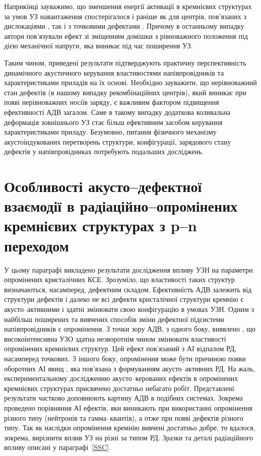 Наприкінці зауважимо, що зменшення енергії активації в кремнієвих структурах за умов
УЗ навантаження спостерігалося і раніше як для центрів, пов'язаних з дислокаціями \cite{KorotchFTP1996}, так і з точковими дефектами \cite{Korotchenkov1995}.
Причому в останньому випадку автори пов'язували ефект зі зміщенням домішки з рівноважного положення під дією механічної напруги, яка виникає під час поширення УЗ.


Таким чином, приведені результати підтверджують практичну перспективність динамічного акустичного керування властивостями напівпровідників та характеристиками приладів на їх основі.
Необхідно зауважити, що нерівноважний стан дефектів (в нашому випадку рекомбінаційних центрів), який виникає при появі нерівноважних носіїв заряду,
є важливим фактором підвищення ефективності АДВ загалом.
Саме в такому випадку додаткова коливальна деформація зовнішнього УЗ стає більш ефективним засобом керування характеристиками приладу.
Безумовно, питання фізичного механізму акустоіндукованих перетворень структури, конфігурації, зарядового стану дефектів у напівпровідниках потребують подальших досліджень.



\section{Особливості акусто--дефектної взаємодії в радіаційно--опромінених кремнієвих структурах з p--n переходом\label{Rad_SSC}}
У цьому параграфі викладено результати дослідження впливу УЗН на параметри опромінених кристалічних КСЕ.
Зрозуміло, що властивості таких структур визначаються, насамперед, дефектним складом.
Ефективність АДВ залежить від структури дефектів \cite{UST:Medvid} і
далеко не всі дефекти кристалічної структури кремнію є акусто--активними і здатні змінювати свою конфігурацію в умовах УЗН.
Одним з найбільш поширених та вивчених способів зміни дефектної підсистеми напівпровідників є опромінення.
З точки зору АДВ, з одного боку, виявлено \cite{YOlikh2007TPLr,Parchinskii2006r,Gorb2010,Podolian2012r}, що високоінтенсивна УЗО
здатна незворотнім чином змінювати властивості опромінених кремнієвих структур.
Цей ефект пов'язаний з АІ відпалом РД, насамперед точкових.
З іншого боку, опромінення може бути причиною появи оборотних АІ явищ \cite{YOlikh2006TPLr,YOlikhTPL2011r},
яка пов'язана з формуванням акусто--активних РД.
На жаль, експериментальному  дослідженню акусто--керованих ефектів в опромінених кремнієвих структурах присвячено достатньо небагато робіт.
Представлені результати частково доповнюють картину АДВ в подібних системах.
Зокрема проведено порівняння АІ ефектів, яки виникають при використанні опромінення різного типу (нейтронів та гамма--квантів),
а отже при появі дефектів різного типу.
Так як наслідки опромінення кремнію вивчені достатньо добре, то вдалося, зокрема, вирізнити
вплив УЗ на різні за типом РД.
Зразки та деталі радіаційного впливу описані у параграфі~\ref{SSC}.

